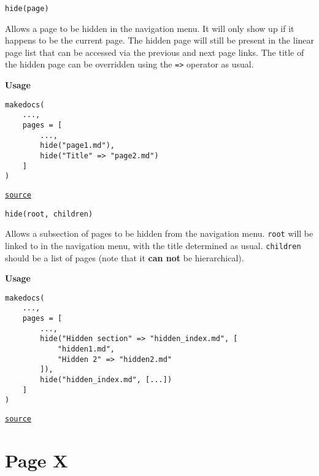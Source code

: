 \begin{adjustwidth}{2em}{0pt}


\begin{lstlisting}[]
hide(page)

\end{lstlisting}

Allows a page to be hidden in the navigation menu. It will only show up if it happens to be the current page. The hidden page will still be present in the linear page list that can be accessed via the previous and next page links. The title of the hidden page can be overridden using the \texttt{=>} operator as usual.

\textbf{Usage}


\begin{lstlisting}[]
makedocs(
    ...,
    pages = [
        ...,
        hide("page1.md"),
        hide("Title" => "page2.md")
    ]
)
\end{lstlisting}



\href{https://github.com/BambOoxX/Documenter.jl/blob/d157febde213549ed0d45c894f0651560da477d3/src/makedocs.jl#L282}{\texttt{source}}



\begin{lstlisting}[]
hide(root, children)

\end{lstlisting}

Allows a subsection of pages to be hidden from the navigation menu. \texttt{root} will be linked to in the navigation menu, with the title determined as usual. \texttt{children} should be a list of pages (note that it \textbf{can not} be hierarchical).

\textbf{Usage}


\begin{lstlisting}[]
makedocs(
    ...,
    pages = [
        ...,
        hide("Hidden section" => "hidden_index.md", [
            "hidden1.md",
            "Hidden 2" => "hidden2.md"
        ]),
        hide("hidden_index.md", [...])
    ]
)
\end{lstlisting}



\href{https://github.com/BambOoxX/Documenter.jl/blob/d157febde213549ed0d45c894f0651560da477d3/src/makedocs.jl#L306}{\texttt{source}}


\end{adjustwidth}

\chapter{Page X}


